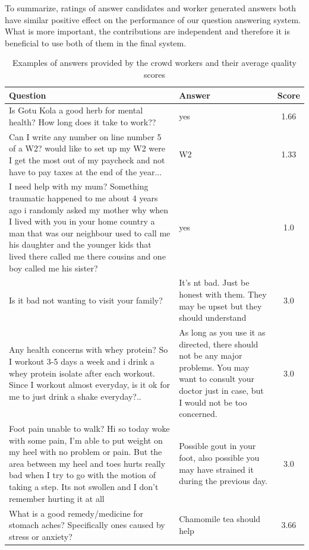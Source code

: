 To summarize, ratings of answer candidates and worker generated answers both have similar positive effect on the performance of our question answering system.
What is more important, the contributions are independent and therefore it is beneficial to use both of them in the final system.

\begin{table}[ht]
\centering
\begin{tabular}{| p{10.5cm} | p{5cm} | c |}
\hline
Question & Answer & Score \\
\hline
 Is Gotu Kola a good herb for mental health? How long does it take to work?? & yes & 1.66\\
 \hline
Can I write any number on line number 5 of a W2?  would like to set up my W2 were I get the most out of my paycheck and not have to pay taxes at the end of the year... & W2 & 1.33\\
 \hline
I need help with my mum? Something traumatic happened to me about 4 years ago i randomly asked my mother why when I lived with you in your home country a man that was our neighbour used to call me his daughter and the younger kids that lived there called me there cousins and one boy called me his sister? & yes & 1.0\\
\hline
\hline
 Is it bad not wanting to visit your family? & It's nt bad. Just be honest with them. They may be upset but they should understand & 3.0 \\
 \hline
Any health concerns with whey protein? So I workout 3-5 days a week and i drink a whey protein isolate after each workout. Since I workout almost everyday, is it ok for me to just drink a shake everyday?.. & As long as you use it as directed, there should not be any major problems.  You may want to consult your doctor just in case, but I would not be too concerned. & 3.0\\
\hline
Foot pain unable to walk? Hi so today woke with some pain, I'm able to put weight on my heel with no problem or pain.  But  the area between my heel and toes hurts really bad when I try to go with the motion of taking a step. Its not swollen and I don't remember hurting it at all & Possible gout in your foot, also possible you may have strained it during the previous day. & 3.0\\
\hline
What is a good remedy/medicine for stomach aches? Specifically ones caused by stress or anxiety? & Chamomile tea should help & 3.66\\
\hline
\end{tabular}
\caption{Examples of answers provided by the crowd workers and their average quality scores}
\label{table:crowdsourcing:crqa:answer_examples}
\end{table}

